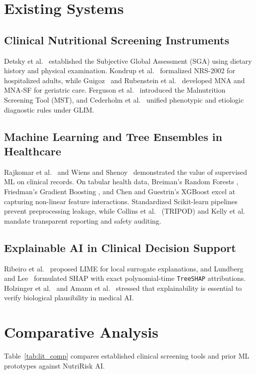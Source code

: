 \documentclass[12pt,a4paper]{report}
\begin{document}
\section{Existing Systems}
\subsection{Clinical Nutritional Screening Instruments}
Detsky et al.~\cite{detsky1987what} established the Subjective Global Assessment (SGA) using dietary history and physical examination. Kondrup et al.~\cite{kondrup2003espen} formalized NRS-2002 for hospitalized adults, while Guigoz~\cite{guigoz2006mini} and Rubenstein et al.~\cite{rubenstein2001screening} developed MNA and MNA-SF for geriatric care. Ferguson et al.~\cite{ferguson1999development} introduced the Malnutrition Screening Tool (MST), and Cederholm et al.~\cite{cederholm2019glim} unified phenotypic and etiologic diagnostic rules under GLIM.

\subsection{Machine Learning and Tree Ensembles in Healthcare}
Rajkomar et al.~\cite{rajkomar2018scalable} and Wiens and Shenoy~\cite{wiens2018machine} demonstrated the value of supervised ML on clinical records. On tabular health data, Breiman's Random Forests \cite{breiman2001random}, Friedman's Gradient Boosting \cite{friedman2001greedy}, and Chen and Guestrin's XGBoost \cite{chen2016xgboost} excel at capturing non-linear feature interactions. Standardized Scikit-learn pipelines \cite{pedregosa2011scikit} prevent preprocessing leakage, while Collins et al.~\cite{collins2015tripod} (TRIPOD) and Kelly et al.~\cite{kelly2019key} mandate transparent reporting and safety auditing.

\subsection{Explainable AI in Clinical Decision Support}
Ribeiro et al.~\cite{ribeiro2016why} proposed LIME for local surrogate explanations, and Lundberg and Lee~\cite{lundberg2017unified} formulated SHAP with exact polynomial-time \texttt{TreeSHAP} attributions. Holzinger et al.~\cite{holzinger2019causability} and Amann et al.~\cite{amann2020explainability} stressed that explainability is essential to verify biological plausibility in medical AI.

\section{Comparative Analysis}
Table~\ref{tab:lit_comp} compares established clinical screening tools and prior ML prototypes against NutriRisk AI.
\end{document}
